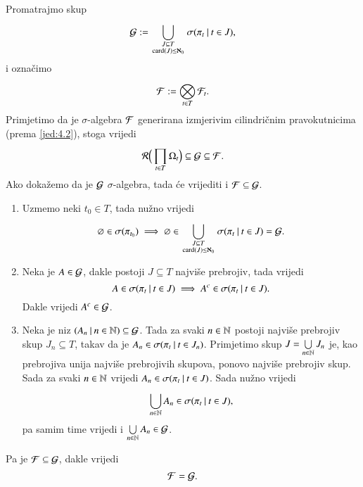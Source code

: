 \begin{rj}
    Promatrajmo skup
    \begin{equation*}
        \mathcal{G} := \bigcup\limits_{
            \begin{smallmatrix}
                J \subseteq T\\
                \textnormal{card}({J}) \leq \aleph_0
            \end{smallmatrix}
        }^{} \sigma({\pi_t} \: | \: {t \in J}),
    \end{equation*}
    i ozna\v cimo
    \begin{equation*}
        \mathcal{F} := \bigotimes\limits_{t \in T}^{} \mathcal{F}_t.
    \end{equation*}
    Primjetimo da je $\sigma$-algebra $\mathcal{F}$ generirana izmjerivim cilindri\v cnim pravokutnicima (prema \eqref{jed:4.2}), stoga vrijedi
    \begin{equation*}
        \mathcal{R} \Big( \prod\limits_{t \in T}^{} \Omega_t \Big) \subseteq \mathcal{G} \subseteq \mathcal{F}.
    \end{equation*}
    Ako doka\v zemo da je $\mathcal{G}$ $\sigma$-algebra, tada \' ce vrijediti i $\mathcal{F} \subseteq \mathcal{G}$.
    \begin{enumerate}[label=(\roman*)]
        \item Uzmemo neki $t_0 \in T$, tada nu\v zno vrijedi
        \begin{equation*}
            \varnothing \in \sigma({\pi_{t_0}}) \implies \varnothing \in \bigcup\limits_{
                \begin{smallmatrix}
                    J \subseteq T\\
                    \textnormal{card}({J}) \leq \aleph_0
                \end{smallmatrix}
            }^{} \sigma({\pi_t} \: | \: {t \in J}) = \mathcal{G}.
        \end{equation*}
        \item Neka je $A \in \mathcal{G}$, dakle postoji $J \subseteq T$ najvi\v se prebrojiv, tada vrijedi
        \begin{equation*}
            A \in \sigma({\pi_t} \: | \: {t \in J}) \implies A^c \in \sigma({\pi_t} \: | \: {t \in J}).
        \end{equation*}
        Dakle vrijedi $A^c \in \mathcal{G}$.
        \item Neka je niz $({A_n} \: | \: {n \in \mathbb{N}}) \subseteq \mathcal{G}$.
        Tada za svaki $n \in \mathbb{N}$ postoji najvi\v se prebrojiv skup $J_n \subseteq T$, takav da je $A_n \in \sigma({\pi_t} \: | \: {t \in J_n})$.
        Primjetimo skup $J = \bigcup\limits_{n \in \mathbb{N}}^{} J_n$ je, kao prebrojiva unija najvi\v se prebrojivih skupova, ponovo najvi\v se prebrojiv skup.
        Sada za svaki $n \in \mathbb{N}$ vrijedi $A_n \in \sigma({\pi_t} \: | \: {t \in J})$.
        Sada nu\v zno vrijedi
        \begin{equation*}
            \bigcup\limits_{n \in \mathbb{N}}^{} A_n \in \sigma({\pi_t} \: | \: {t \in J}),
        \end{equation*}
        pa samim time vrijedi i $\bigcup\limits_{n \in \mathbb{N}}^{} A_n \in \mathcal{G}$.
    \end{enumerate}
    Pa je $\mathcal{F} \subseteq \mathcal{G}$, dakle vrijedi
    \begin{equation*}
        \mathcal{F} = \mathcal{G}.
    \end{equation*}
\end{rj}

